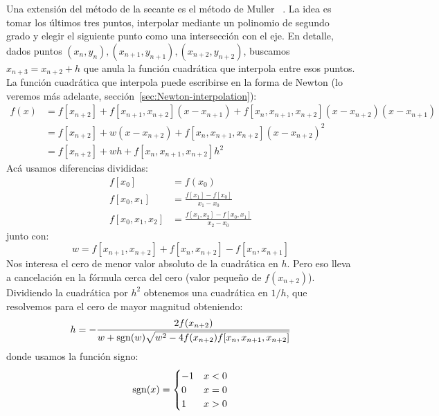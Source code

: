   Una extensión del método de la secante es el método de Muller~%
    \cite{muller56:_method_solvin_algeb_equat_using_autom_comput}.
  La idea es tomar los últimos tres puntos,
  interpolar mediante un polinomio de segundo grado
  y elegir el siguiente punto como una intersección con el eje.
  En detalle,
  dados puntos
  \((x_n, y_n), (x_{n + 1}, y_{n + 1}), (x_{n + 2}, y_{n + 2})\),
  buscamos \(x_{n + 3} = x_{n + 2} + h\)
  que anula la función cuadrática que interpola entre esos puntos.
  La función cuadrática que interpola puede escribirse en la forma de Newton
  (lo veremos más adelante,
   sección~\ref{sec:Newton-interpolation}):
  \begin{align*}
    f(x)
      &= f[x_{n + 2}]
           + f[x_{n + 1}, x_{n + 2}] (x - x_{n + 1})
           + f[x_n, x_{n + 1}, x_{n + 2}]
                (x - x_{n + 2}) (x - x_{n + 1}) \\
      &= f[x_{n + 2}]
           + w (x - x_{n + 2})
           + f[x_n, x_{n + 1}, x_{n + 2}] (x - x_{n + 2})^2 \\
       &= f[x_{n + 2}]
           + w h
           + f[x_n, x_{n + 1}, x_{n + 2}] h^2
  \end{align*}
  Acá usamos diferencias divididas:
  \begin{align*}
    f[x_0]
      &= f(x_0) \\
    f[x_0, x_1]
      &= \frac{f[x_1] - f[x_0]}{x_1 - x_0} \\
    f[x_0, x_1, x_2]
      &= \frac{f[x_1, x_2] - f[x_0, x_1]}{x_2 - x_0}
  \end{align*}
  junto con:
  \begin{equation*}
    w
      = f[x_{n + 1}, x_{n + 2}] + f[x_n, x_{n + 2}] - f[x_n, x_{n + 1}]
  \end{equation*}
  Nos interesa el cero de menor valor absoluto de la cuadrática en \(h\).
  Pero eso lleva a cancelación en la fórmula cerca del cero
  (valor pequeño de \(f(x_{n + 2})\)).
  Dividiendo la cuadrática por \(h^2\) obtenemos una cuadrática en \(1 / h\),
  que resolvemos para el cero de mayor magnitud obteniendo:
  \begin{equation}
    h
      = - \frac{2 f(x_{n + 2})}
               {w + \operatorname{sgn}(w)
                      \sqrt{w^2
                              - 4 f(x_{n + 2}) f[x_n, x_{n + 1}, x_{n + 2}]}}
  \end{equation}
  donde usamos la función signo:
  \begin{equation*}
    \operatorname{sgn}(x)
      = \begin{cases}
          -1 & x < 0 \\
           0 & x = 0 \\
           1 & x > 0
        \end{cases}
  \end{equation*}
